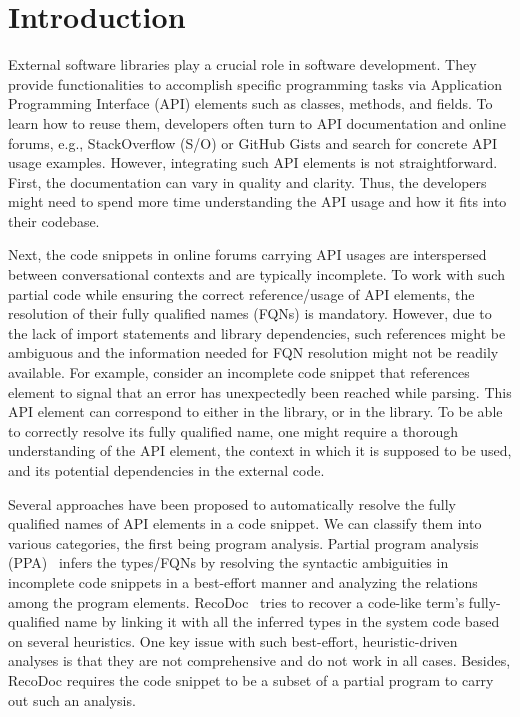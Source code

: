 \section{Introduction}
\label{sec:intro}

External software libraries play a crucial role in software development. They provide functionalities to accomplish specific programming tasks via Application Programming Interface (API) elements such as classes, methods, and fields. To learn how to reuse them, developers often turn to API documentation and online forums, e.g., StackOverflow (S/O) or GitHub Gists and search for concrete API usage examples. However, integrating such API elements is not straightforward. First, the documentation can vary in quality and clarity. Thus, the developers might need to spend more time understanding the API usage and how it fits into their codebase.

Next, the code snippets in online forums carrying API usages are interspersed between conversational contexts and are typically incomplete. To work with such partial code while ensuring the correct reference/usage of API elements, the resolution of their fully qualified names (FQNs) is mandatory.
However, due to the lack of import statements and library dependencies, such references might be ambiguous and the information needed for FQN resolution might not be readily available. For example, consider an incomplete code snippet that references  element to signal that an error has unexpectedly been reached while parsing. This API element can correspond to either  in the  library, or  in the  library. To be able to correctly resolve its fully qualified name, one might require a thorough understanding of the API element, the context in which it is supposed to be used, and its potential dependencies in the external code.


Several approaches have been proposed to automatically resolve the fully qualified names of API elements in a code snippet. We can classify them into various categories, the first being program analysis. Partial program analysis (PPA)~\cite{dagenais-oopsla08} infers the types/FQNs by resolving the syntactic ambiguities in incomplete code snippets in a best-effort manner and analyzing the relations among the program elements. RecoDoc~\cite{dagenais-icse12} tries to recover a code-like term's fully-qualified name by linking it with all the inferred types in the system code based on several heuristics. One key issue with such best-effort, heuristic-driven analyses is that they are not comprehensive and do not work in all cases. Besides, RecoDoc requires the code snippet to be a subset of a partial program to carry out such an analysis.

